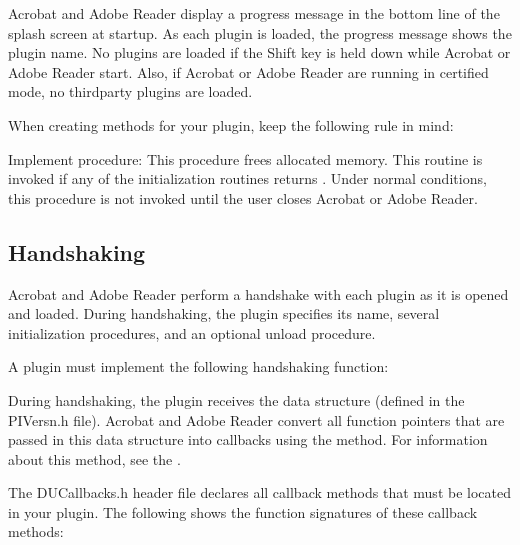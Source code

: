 \documentclass[letterpaper,12pt,english,openany,oneside]{sphinxmanual}
\begin{document}
Acrobat and Adobe Reader display a progress message in the bottom line of the splash screen at start\sphinxhyphen{}up. As each plugin is loaded, the progress message shows the plugin name. No plugins are loaded if the Shift key is held down while Acrobat or Adobe Reader start. Also, if Acrobat or Adobe Reader are running in certified mode, no third\sphinxhyphen{}party plugins are loaded.

When creating methods for your plugin, keep the following rule in mind:

Implement  procedure: This procedure frees allocated memory. This routine is invoked if any of the initialization routines returns . Under normal conditions, this procedure is not invoked until the user closes Acrobat or Adobe Reader.


\subsection{Handshaking}
\label{\detokenize{Plugins_Pimech:handshaking}}
Acrobat and Adobe Reader perform a handshake with each plugin as it is opened and loaded. During handshaking, the plugin specifies its name, several initialization procedures, and an optional unload procedure.

A plugin must implement the following handshaking function:

\begin{sphinxVerbatim}[commandchars=\\\{\}]
      
\end{sphinxVerbatim}

During handshaking, the plugin receives the  data structure (defined in the PIVersn.h file). Acrobat and Adobe Reader convert all function pointers that are passed in this data structure into callbacks using the  method. For information about this method, see the .

The DUCallbacks.h header file declares all callback methods that must be located in your plugin. The following shows the function signatures of these callback methods:

\begin{sphinxVerbatim}[commandchars=\\\{\}]
   
   
   
   
\end{sphinxVerbatim}
\end{document}
